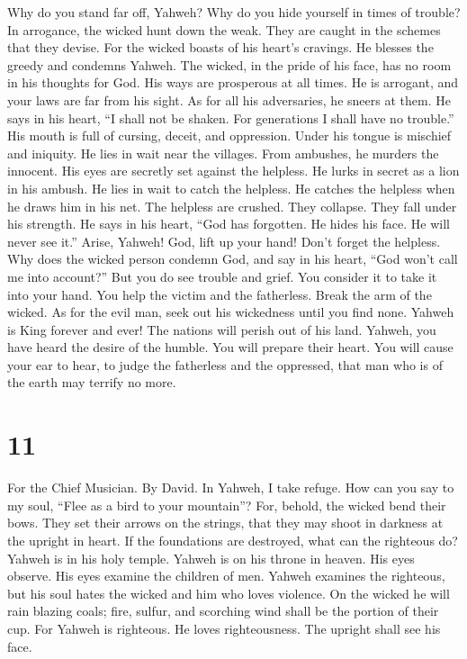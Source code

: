  Why do you stand far off, Yahweh? Why do you hide yourself
in times of trouble?  In arrogance, the wicked hunt down the
weak. They are caught in the schemes that they devise.  For
the wicked boasts of his heart's cravings. He blesses the greedy and
condemns Yahweh.  The wicked, in the pride of his face, has
no room in his thoughts for God.  His ways are prosperous at
all times. He is arrogant, and your laws are far from his sight. As for
all his adversaries, he sneers at them.  He says in his
heart, ``I shall not be shaken. For generations I shall have no
trouble.''  His mouth is full of cursing, deceit, and
oppression. Under his tongue is mischief and iniquity.  He
lies in wait near the villages. From ambushes, he murders the innocent.
His eyes are secretly set against the helpless.  He lurks in
secret as a lion in his ambush. He lies in wait to catch the helpless.
He catches the helpless when he draws him in his net.  The
helpless are crushed. They collapse. They fall under his strength.
 He says in his heart, ``God has forgotten. He hides his
face. He will never see it.''  Arise, Yahweh! God, lift up
your hand! Don't forget the helpless.  Why does the wicked
person condemn God, and say in his heart, ``God won't call me into
account?''  But you do see trouble and grief. You consider
it to take it into your hand. You help the victim and the fatherless.
 Break the arm of the wicked. As for the evil man, seek out
his wickedness until you find none.  Yahweh is King forever
and ever! The nations will perish out of his land.  Yahweh,
you have heard the desire of the humble. You will prepare their heart.
You will cause your ear to hear,  to judge the fatherless
and the oppressed, that man who is of the earth may terrify no more.

\hypertarget{section-10}{%
\section{11}\label{section-10}}

For the Chief Musician. By David.  In Yahweh, I take refuge.
How can you say to my soul, ``Flee as a bird to your mountain''?
 For, behold, the wicked bend their bows. They set their
arrows on the strings, that they may shoot in darkness at the upright in
heart.  If the foundations are destroyed, what can the
righteous do?  Yahweh is in his holy temple. Yahweh is on
his throne in heaven. His eyes observe. His eyes examine the children of
men.  Yahweh examines the righteous, but his soul hates the
wicked and him who loves violence.  On the wicked he will
rain blazing coals; fire, sulfur, and scorching wind shall be the
portion of their cup.  For Yahweh is righteous. He loves
righteousness. The upright shall see his face.

